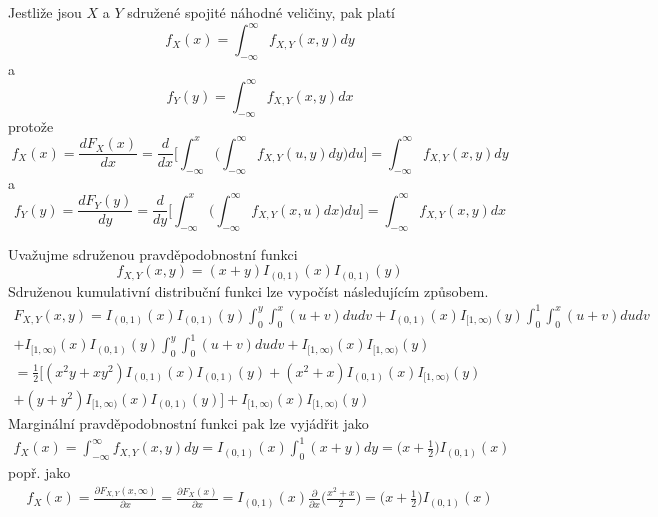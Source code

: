 Jestliže jsou $X$ a $Y$ sdružené spojité náhodné veličiny, pak platí
\begin{equation*}
f_X(x) = \int_{-\infty}^{\infty} f_{X,Y}(x,y)dy
\end{equation*}
a
\begin{equation*}
f_Y(y) = \int_{-\infty}^{\infty} f_{X,Y}(x,y)dx
\end{equation*}
protože
\begin{equation*}
f_X(x) = \frac{d F_X(x)}{dx} = \frac{d}{dx}\Big[\int_{-\infty}^x \Big(\int_{-\infty}^{\infty}f_{X,Y}(u,y)dy \Big) du \Big] = \int_{-\infty}^{\infty} f_{X,Y}(x,y)dy
\end{equation*}
a
\begin{equation*}
f_Y(y) = \frac{d F_Y(y)}{dy} = \frac{d}{dy}\Big[\int_{-\infty}^x \Big(\int_{-\infty}^{\infty}f_{X,Y}(x,u)dx \Big) du \Big] = \int_{-\infty}^{\infty} f_{X,Y}(x,y)dx
\end{equation*}

\begin{example}
Uvažujme sdruženou pravděpodobnostní funkci
\begin{equation*}
f_{X,Y}(x,y) = (x + y)I_{(0,1)}(x) I_{(0, 1)}(y)
\end{equation*}
Sdruženou kumulativní distribuční funkci lze vypočíst následujícím způsobem.
\begin{gather*}
F_{X,Y}(x,y) = I_{(0,1)}(x) I_{(0, 1)}(y) \int_0^y \int_0^x (u + v)du dv + I_{(0,1)}(x)I_{[1, \infty)}(y) \int_0^1 \int_0^x (u + v)du dv\\
+ I_{[1, \infty)}(x)I_{(0,1)}(y) \int_0^y \int_0^1 (u + v) du dv + I_{[1, \infty)}(x)I_{[1, \infty)}(y)\\
= \frac{1}{2}[(x^2y + xy^2)I_{(0,1)}(x)I_{(0,1)}(y) + (x^2 + x)I_{(0, 1)}(x)I_{[1, \infty)}(y)\\
+ (y + y^2)I_{[1, \infty)}(x)I_{(0, 1)}(y)] + I_{[1, \infty)}(x)I_{[1, \infty)}(y)
\end{gather*}
Marginální pravděpodobnostní funkci pak lze vyjádřit jako
\begin{gather*}
f_X(x) = \int_{-\infty}^{\infty} f_{X,Y}(x,y)dy = I_{(0, 1)}(x) \int_0^1(x+y)dy = \big(x + \frac{1}{2} \big)I_{(0, 1)}(x)
\end{gather*}
popř. jako
\begin{gather*}
f_X(x) = \frac{\partial F_{X,Y}(x, \infty)}{\partial x} = \frac{\partial F_X(x)}{\partial x} = I_{(0,1)}(x) \frac{\partial}{\partial x} \Big(\frac{x^2 + x}{2} \Big) = \big(x + \frac{1}{2} \big)I_{(0, 1)}(x)
\end{gather*}
\end{example}

